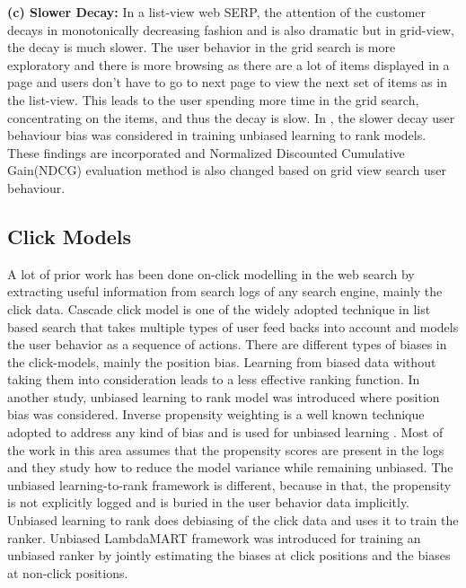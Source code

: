 \documentclass[11pt]{article}
\begin{document}
\newline
\textbf{(c) Slower Decay:} In a list-view web SERP, the attention of the customer decays in monotonically decreasing fashion and is also dramatic but in grid-view, the decay is much slower. The user behavior in the grid search is more exploratory and there is more browsing as there are a lot of items displayed in a page and users don't have to go to next page to view the next set of items as in the list-view. This leads to the user spending more time in the grid search, concentrating on the items, and thus the decay is slow. In \cite{10.1145/3394486.3403336}, the slower decay user behaviour bias was considered in training unbiased learning to rank models.
\newline
These findings are incorporated and Normalized Discounted Cumulative Gain(NDCG) evaluation method is also changed based on grid view search user behaviour.    

\subsection{Click Models} 
A lot of prior work has been done on-click modelling in the web search by extracting useful information from search logs of any search engine, mainly the click data. Cascade click model is one of the widely adopted technique in list based search that takes multiple types of user feed backs into account and models the user behavior as a sequence of actions\cite{10.1145/3159652.3159732, 10.1145/1341531.1341545}. There are different types of biases in the click-models, mainly the position bias. Learning from biased data without taking them into consideration leads to a less effective ranking function. In another study, unbiased learning to rank model was introduced where position bias was considered. 
Inverse propensity weighting is a well known technique adopted to address any kind of bias and is used for unbiased learning \cite{10.1145/3159652.3159732}. Most of the work in this area assumes that the propensity scores are present in the logs and they study how to reduce the model variance while remaining unbiased. The unbiased learning-to-rank framework is different, because in that, the propensity is not explicitly logged and is buried in the user behavior data implicitly. Unbiased learning to rank does debiasing of the click data and uses it to train the ranker. Unbiased LambdaMART framework \cite{10.1145/3308558.3313447} was introduced for training an unbiased ranker by jointly estimating the biases at click positions and the biases at non-click positions.
\end{document}

